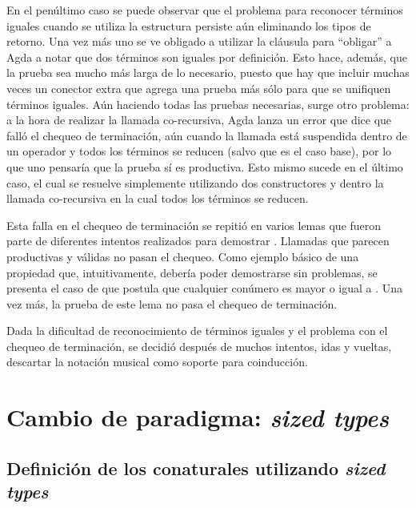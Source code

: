 
En el penúltimo caso se puede observar que el problema para reconocer términos iguales cuando se utiliza la estructura  persiste aún eliminando los tipos de retorno. Una vez más uno se ve obligado a utilizar la cláusula  para ``obligar'' a Agda a notar que dos términos son iguales por definición. Esto hace, además, que la prueba sea mucho más larga de lo necesario, puesto que hay que incluir muchas veces un conector  extra que agrega una prueba más sólo para que se unifiquen términos iguales. Aún haciendo todas las pruebas necesarias, surge otro problema: a la hora de realizar la llamada co-recursiva, Agda lanza un error que dice que falló el chequeo de terminación, aún cuando la llamada está suspendida dentro de un operador \AgdaCoinductiveConstructor{$\sharp$} y todos los términos se reducen (salvo  que es el caso base), por lo que uno pensaría que la prueba sí es productiva. Esto mismo sucede en el último caso, el cual se resuelve simplemente utilizando dos constructores  y dentro la llamada co-recursiva en la cual todos los términos se reducen. 

Esta falla en el chequeo de terminación se repitió en varios lemas que fueron parte de diferentes intentos realizados para demostrar . Llamadas que parecen productivas y válidas no pasan el chequeo. Como ejemplo básico de una propiedad que, intuitivamente, debería poder demostrarse sin problemas, se presenta el caso de  que postula que cualquier conúmero es mayor o igual a . Una vez más, la prueba de este lema no pasa el chequeo de terminación.


Dada la dificultad de reconocimiento de términos iguales y el problema con el chequeo de terminación, se decidió después de muchos intentos, idas y vueltas, descartar la notación musical como soporte para coinducción.

\section{Cambio de paradigma: \textit{sized types}}

\subsection{Definición de los conaturales utilizando \textit{sized types}}

